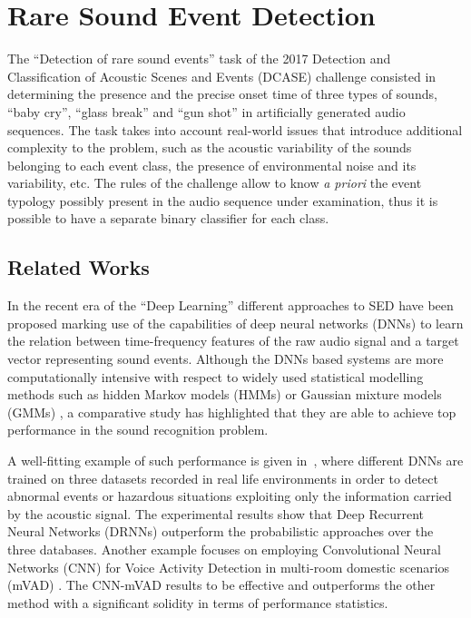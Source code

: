 \section{Rare Sound Event Detection}

The ``Detection of rare sound events'' task of the 2017 Detection and Classification of Acoustic Scenes and Events (DCASE) challenge \cite{DCASE2017Workshop} consisted in determining the presence and the precise onset time of three types of sounds, ``baby cry'', ``glass break'' and ``gun shot'' in artificially generated audio sequences. 
The task takes into account real-world issues that introduce additional complexity to the problem, such as the acoustic variability of the sounds belonging to each event class, the presence of environmental noise and its variability, etc. The rules of the challenge allow to know \textit{a priori} the event typology possibly present in the audio sequence under examination, thus it is possible to have a separate binary classifier for each class.

\subsection{Related Works}
In the recent era of the ``Deep Learning'' different approaches to SED have been proposed marking use of the capabilities of deep neural networks (DNNs) to learn the relation between time-frequency features of the raw audio signal and a target vector representing sound events.
Although the DNNs based systems are more computationally intensive with respect to  widely used statistical modelling methods such as hidden Markov models (HMMs) or Gaussian mixture models (GMMs)  \cite{heittola2010audio, peng2009healthcare}, a comparative study \cite{sigtia2016automatic} has highlighted that they are able to achieve top performance in the sound recognition problem.

A well-fitting example of such performance is given in~\cite{marchi2017deep}, where different DNNs are trained on three datasets recorded in real life environments in order to detect abnormal events or hazardous situations exploiting only the information carried by the acoustic signal. The experimental results show that Deep Recurrent Neural Networks (DRNNs) outperform the probabilistic approaches over the three databases. 
Another example focuses on employing Convolutional Neural Networks (CNN)  for Voice Activity Detection in multi-room domestic scenarios (mVAD) \cite{vecchiotti2018convolutional}. The CNN-mVAD results to be effective and outperforms the other method with a significant solidity in terms of performance statistics.

